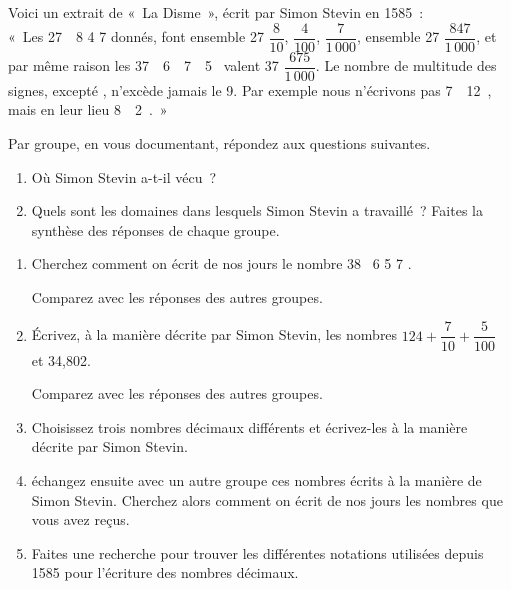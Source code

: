 
\begin{TP}[]
Voici un extrait de « La Disme », écrit par Simon Stevin en 1585 : \\[0.3em]

« Les 27  8  4  7  donnés, font ensemble 27 $\dfrac{8}{10}$, $\dfrac{4}{100}$, $\dfrac{7}{1\,000}$, ensemble 27 $\dfrac{847}{1\,000}$, et par même raison les 37  6  7  5  valent 37 $\dfrac{675}{1\,000}$. Le nombre de multitude des signes, excepté , n'excède jamais le 9. Par exemple nous n'écrivons pas 7  12 , mais en leur lieu 8  2 . »


Par groupe, en vous documentant, répondez aux questions suivantes.
\begin{enumerate}
 \item Où Simon Stevin a-t-il vécu ?
 \item Quels sont les domaines dans lesquels Simon Stevin a travaillé ? Faites la synthèse des réponses de chaque groupe.
 \end{enumerate}
 

\begin{enumerate}
\item Cherchez comment on écrit de nos jours le nombre 38  6  5  7 ­.

Comparez avec les réponses des autres groupes.

\item Écrivez, à la manière décrite par Simon Stevin, les nombres $124 + \dfrac{7}{10} + \dfrac{5}{100}$ et 34,802.

Comparez avec les réponses des autres groupes.

 \item Choisissez trois nombres décimaux différents et écrivez-les à la manière décrite par Simon Stevin.
 \item échangez ensuite avec un autre groupe ces nombres écrits à la manière de Simon Stevin. Cherchez alors comment on écrit de nos jours les nombres que vous avez reçus.
 \item Faites une recherche pour trouver les différentes notations utilisées depuis 1585 pour l'écriture des nombres décimaux.
 \end{enumerate}
\end{TP}

